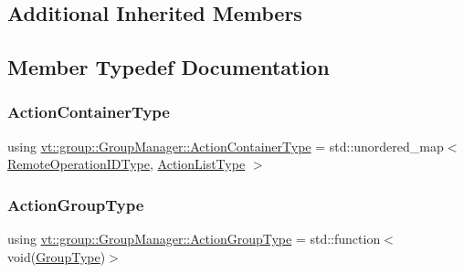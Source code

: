 \subsection*{Additional Inherited Members}


\subsection{Member Typedef Documentation}
\mbox{\label{structvt_1_1group_1_1_group_manager_af722b277e2ad6a8dacdfec0184cd8f2f}} 
\subsubsection{\texorpdfstring{Action\+Container\+Type}{ActionContainerType}}
{\footnotesize\ttfamily using \hyperlink{structvt_1_1group_1_1_group_manager_af722b277e2ad6a8dacdfec0184cd8f2f}{vt\+::group\+::\+Group\+Manager\+::\+Action\+Container\+Type} =  std\+::unordered\+\_\+map$<$ \hyperlink{namespacevt_1_1group_a73f2624ddeb535b39a08b6524f26b244}{Remote\+Operation\+I\+D\+Type}, \hyperlink{structvt_1_1group_1_1_group_manager_a48b2dd05bbdda19c5d6195b8932a2716}{Action\+List\+Type} $>$}

\mbox{\label{structvt_1_1group_1_1_group_manager_ae871c5871ad62b530220009c1ee4d4b9}} 
\subsubsection{\texorpdfstring{Action\+Group\+Type}{ActionGroupType}}
{\footnotesize\ttfamily using \hyperlink{structvt_1_1group_1_1_group_manager_ae871c5871ad62b530220009c1ee4d4b9}{vt\+::group\+::\+Group\+Manager\+::\+Action\+Group\+Type} =  std\+::function$<$void(\hyperlink{namespacevt_a27b5e4411c9b6140c49100e050e2f743}{Group\+Type})$>$}

\mbox{\label{structvt_1_1group_1_1_group_manager_a48b2dd05bbdda19c5d6195b8932a2716}} 
